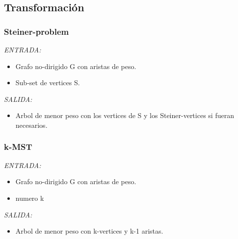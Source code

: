 \documentclass[preprint,12pt]{elsarticle}
\begin{document}
\subsection{Transformación}
\subsubsection*{\textbf{Steiner-problem}}
\textit{ENTRADA: }
\begin{itemize}
\item Grafo no-dirigido G con aristas de peso.
\item Sub-set de vertices S.
\end{itemize}
\textit{SALIDA: }
\begin{itemize}
\item Arbol de menor peso con los vertices de S y los Steiner-vertices si fueran necesarios.\\
\end{itemize}

\subsubsection*{\textbf{k-MST}}
\textit{ENTRADA: }
\begin{itemize}
\item Grafo no-dirigido G con aristas de peso.
\item numero k
\end{itemize}
\textit{SALIDA: }
\begin{itemize}
\item Arbol de menor peso con k-vertices y k-1 aristas.
\end{itemize}
\end{document}
